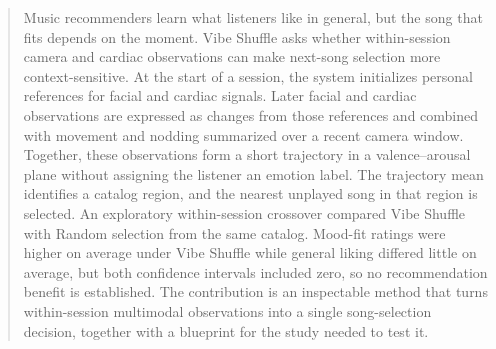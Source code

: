 \begin{abstract}
Music recommenders learn what listeners like in general, but the song that fits
depends on the moment. Vibe Shuffle asks whether within-session camera and
cardiac observations can make next-song selection more context-sensitive. At
the start of a session, the system initializes personal references for facial
and cardiac signals. Later facial and cardiac observations are expressed as
changes from those references and combined with movement and nodding summarized
over a recent camera window. Together, these observations form a short
trajectory in a valence--arousal plane without assigning the listener an emotion
label. The trajectory mean identifies a catalog region, and the nearest unplayed
song in that region is selected. An exploratory within-session crossover
compared Vibe Shuffle with Random selection from the same catalog. Mood-fit
ratings were higher on average under Vibe Shuffle while general liking differed
little on average, but both confidence intervals included zero, so no
recommendation benefit is established. The contribution is an inspectable
method that turns within-session multimodal observations into a single
song-selection decision, together with a blueprint for the study needed to test
it.
\end{abstract}
